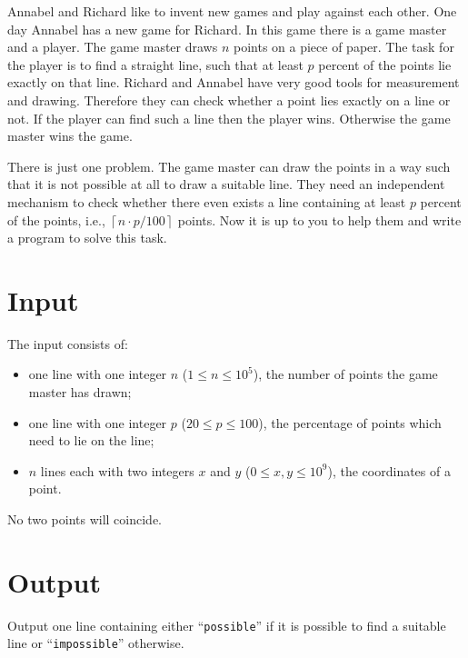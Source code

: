 
\noindent
Annabel and Richard like to invent new games and play against each other.
One day Annabel has a new game for Richard.
In this game there is a game master and a player.
The game master draws $n$ points on a piece of paper.
The task for the player is to find a straight line,
such that at least $p$ percent of the points lie exactly on that line.
Richard and Annabel have very good tools for measurement and drawing.
Therefore they can check whether a point lies exactly on a line or not.
If the player can find such a line then the player wins.
Otherwise the game master wins the game.

There is just one problem.
The game master can draw the points in a way such that it is not possible at all to draw a suitable line.
They need an independent mechanism to check whether there even exists a line containing at least $p$ percent of the points,
i.e., $\left\lceil n\cdot p/100 \right\rceil$ points.
Now it is up to you to help them and write a program to solve this task.

\section*{Input}

The input consists of:
\begin{itemize}
   \item one line with one integer $n$ ($1\le n\le 10^5$), the number of points the game master has drawn;
   \item one line with one integer $p$ ($20\le p \le 100$), the percentage of points which need to lie on the line;
   \item $n$ lines each with two integers $x$ and $y$ ($0\le x,y\le 10^9$),
the coordinates of a point. 
\end{itemize}
No two points will coincide.

\section*{Output}

Output one line containing either ``\texttt{possible}'' if it is possible to find a suitable line
or ``\texttt{impossible}'' otherwise.

